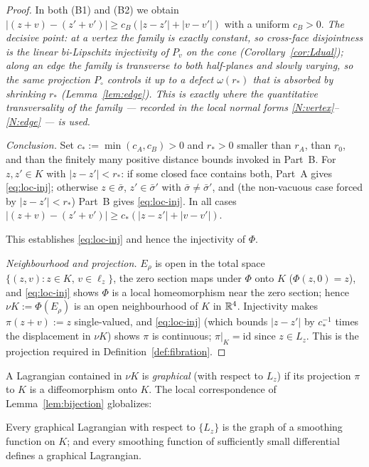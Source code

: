 \begin{proof}
\smallskip
In both (B1) and (B2) we obtain $|(z+v)-(z'+v')|\ge c_B(|z-z'|+|v-v'|)$ with a uniform
$c_B>0$. \emph{The decisive point: at a vertex the family is \emph{exactly} constant,
so cross-face disjointness is the linear bi-Lipschitz injectivity of $P_v$ on the cone
(Corollary~\ref{cor:Ldual}); along an edge the family is \emph{transverse to both
half-planes and slowly varying}, so the same projection $P_\circ$ controls it up to a
defect $\omega(r_\ast)$ that is absorbed by shrinking $r_\ast$ (Lemma~\ref{lem:edge}).
This is exactly where the quantitative transversality of the family --- recorded in
the local normal forms \ref{N:vertex}--\ref{N:edge} --- is used.}

\medskip\noindent\emph{Conclusion.} Set $c_\ast:=\min(c_A,c_B)>0$ and $r_\ast>0$
smaller than $r_A$, than $r_0$, and than the finitely many positive distance bounds
invoked in Part~B. For $z,z'\in K$ with $|z-z'|<r_\ast$: if some closed face contains
both, Part~A gives \eqref{eq:loc-inj}; otherwise $z\in\bar\sigma$, $z'\in\bar\sigma'$
with $\bar\sigma\ne\bar\sigma'$, and (the non-vacuous case forced by $|z-z'|<r_\ast$)
Part~B gives \eqref{eq:loc-inj}. In all cases
$|(z+v)-(z'+v')|\ge c_\ast(|z-z'|+|v-v'|)$.

This establishes \eqref{eq:loc-inj} and hence the injectivity of $\Phi$.

\emph{Neighbourhood and projection.} $E_\rho$ is open in the total space
$\{(z,v):z\in K,\,v\in\ell_z\}$, the zero section maps under $\Phi$ onto $K$
($\Phi(z,0)=z$), and \eqref{eq:loc-inj} shows $\Phi$ is a local homeomorphism near
the zero section; hence $\nu K:=\Phi(E_\rho)$ is an open neighbourhood of $K$ in
$\mathbb{R}^4$. Injectivity makes $\pi(z+v):=z$ single-valued, and \eqref{eq:loc-inj}
(which bounds $|z-z'|$ by $c_\ast^{-1}$ times the displacement in $\nu K$) shows $\pi$
is continuous; $\pi|_K=\mathrm{id}$ since $z\in L_z$. This is the projection required
in Definition~\ref{def:fibration}.
\end{proof}

A Lagrangian contained in
$\nu K$ is \emph{graphical} (with respect to $L_z$) if its projection $\pi$ to $K$
is a diffeomorphism onto $K$. The local correspondence of
Lemma~\ref{lem:bijection} globalizes:

\begin{qeightlemma}\label{lem:graph-global}
Every graphical Lagrangian with respect to $\{L_z\}$ is the graph of a smoothing
function on $K$; and every smoothing function of sufficiently small differential
defines a graphical Lagrangian.
\end{qeightlemma}

